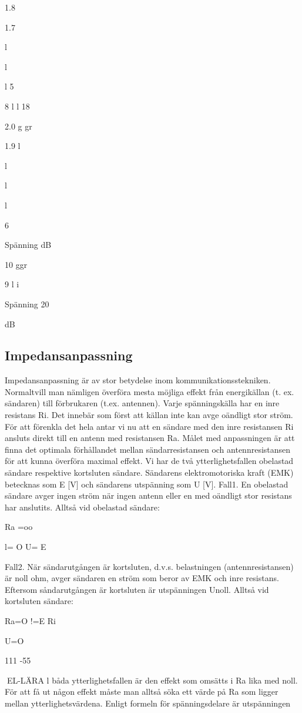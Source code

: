 1.8

1.7

l

l

l
5

8
l
l
18

2.0 g gr

1.9
l

l

l

l

6

Spänning
dB

10 ggr

9
l
i

Spänning
20

dB

\subsection{Impedansanpassning}
Impedansanpassning är av stor betydelse
inom kommunikationsstekniken. Normaltvill
man nämligen överföra mesta möjliga effekt
från energikällan (t. ex. sändaren) till förbrukaren (t.ex. antennen).
Varje spänningskälla har en inre resistans Ri. Det innebär som först att källan inte
kan avge oändligt stor ström. För att förenkla
det hela antar vi nu att en sändare med den
inre resistansen Ri ansluts direkt till en antenn med resistansen Ra.
Målet med anpassningen är att finna det
optimala förhållandet mellan sändarresistansen och antennresistansen för att kunna
överföra maximal effekt. Vi har de två ytterlighetsfallen obelastad sändare respektive
kortsluten sändare. Sändarens elektromotoriska kraft (EMK) betecknas som E [V]
och sändarens utspänning som U [V].
Fall1.
En obelastad sändare avger ingen ström när
ingen antenn eller en med oändligt stor resistans har anslutits.
Alltså vid obelastad sändare:

Ra =oo

l= O U= E

Fall2.
När sändarutgången är kortsluten, d.v.s.
belastningen (antennresistansen) är noll
ohm, avger sändaren en ström som beror av
EMK och inre resistans. Eftersom såndarutgången är kortsluten är utspänningen Unoll.
Alltså vid kortsluten sändare:

Ra=O !=E
Ri

U=O

111 -55

EL-LÄRA
l båda ytterlighetsfallen är den effekt som
omsätts i Ra lika med noll. För att få ut någon
effekt måste man alltså söka ett värde på Ra
som ligger mellan ytterlighetsvärdena.
Enligt formeln för spänningsdelare är
utspänningen

